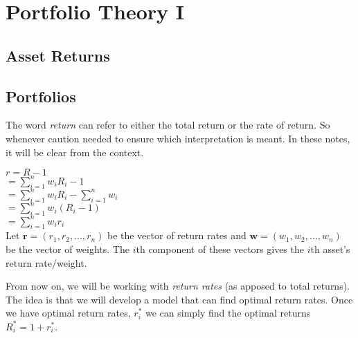 
\chapter{Portfolio Theory I}







\section{Asset Returns}





\section{Portfolios}

The word \textit{return} can refer to either the total return
or the rate of return. So whenever caution needed to ensure
which interpretation is meant. In these notes, 
it will be clear from the context.

$r = R - 1$ \\
$= \sum^{n}_{i = 1} w_i R_i  - 1$ \\
$= \sum^{n}_{i = 1} w_i R_i  - \sum^{n}_{i=1}w_i$ \\
$= \sum^{n}_{i = 1} w_i (R_i - 1)$ \\
$= \sum^{n}_{i = 1} w_i r_i $ \\


Let $\mathbf{r} = (r_1,r_2,...,r_n)$ be the vector of return rates
and $\mathbf{w} = (w_1,w_2,...,w_n)$ be the vector of weights. 
The $i$th component of these vectors gives the $i$th asset's return rate/weight. 





From now on, we will be working with \textit{return rates} (as apposed to total returns). 
The idea is that we will develop a model that can find 
optimal return rates. Once we have optimal return rates, $r^{*}_i$ 
we can simply find the optimal returns $R^{*}_i = 1 + r^{*}_i$.









